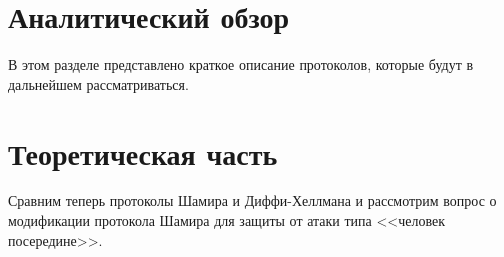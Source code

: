 \section{Аналитический обзор}
В этом разделе представлено краткое описание протоколов, которые будут в дальнейшем рассматриваться.

\section{Теоретическая часть}
Сравним теперь протоколы Шамира и Диффи-Хеллмана и рассмотрим вопрос о модификации протокола Шамира для защиты от атаки типа <<человек посередине>>.

\printbibliography[%
    heading=bibintoc%
]

\appendix
{}


